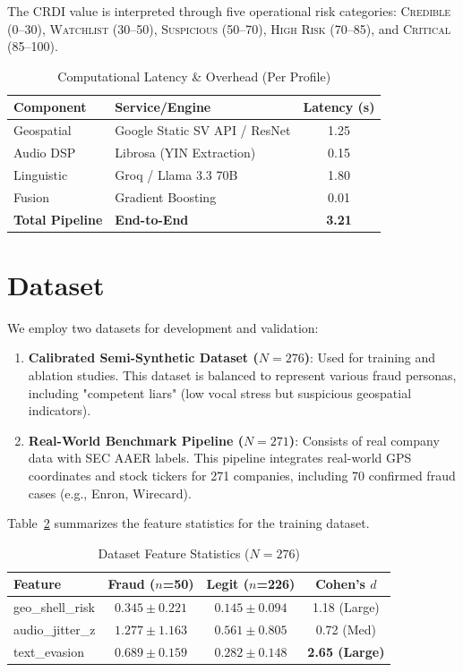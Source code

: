 \documentclass[conference]{IEEEtran}
\begin{document}
The CRDI value is interpreted through five operational risk categories:
\textsc{Credible} (0--30), \textsc{Watchlist} (30--50),
\textsc{Suspicious} (50--70), \textsc{High Risk} (70--85),
and \textsc{Critical} (85--100).

\begin{table}[!t]
 \caption{Computational Latency \& Overhead (Per Profile)}
 \label{tab:latency}
 \centering
 \begin{tabular}{llc}
 \toprule
 \textbf{Component} & \textbf{Service/Engine} & \textbf{Latency (s)} \\
 \midrule
 Geospatial        & Google Static SV API / ResNet & 1.25 \\
 Audio DSP         & Librosa (YIN Extraction)      & 0.15 \\
 Linguistic        & Groq / Llama 3.3 70B          & 1.80 \\
 Fusion & Gradient Boosting             & 0.01 \\
 \midrule
 \textbf{Total Pipeline} & \textbf{End-to-End}    & \textbf{3.21} \\
 \bottomrule
 \end{tabular}
\end{table}

\section{Dataset}

We employ two datasets for development and validation:
\begin{enumerate}
    \item \textbf{Calibrated Semi-Synthetic Dataset ($N=276$)}: Used for training and ablation studies. This dataset is balanced to represent various fraud personas, including "competent liars" (low vocal stress but suspicious geospatial indicators).
    \item \textbf{Real-World Benchmark Pipeline ($N=271$)}: Consists of real company data with SEC AAER labels. This pipeline integrates real-world GPS coordinates and stock tickers for 271 companies, including 70 confirmed fraud cases (e.g., Enron, Wirecard).
\end{enumerate}

Table~\ref{tab:dataset} summarizes the feature statistics for the training dataset.

\begin{table}[!t]
 \caption{Dataset Feature Statistics ($N=276$)}
 \label{tab:dataset}
 \centering
 \begin{tabular}{lccc}
 \toprule
 \textbf{Feature} & \textbf{Fraud ($n$=50)} & \textbf{Legit ($n$=226)} & \textbf{Cohen's $d$} \\
 \midrule
 geo\_shell\_risk & $0.345 \pm 0.221$ & $0.145 \pm 0.094$ & 1.18 (Large) \\
 audio\_jitter\_z & $1.277 \pm 1.163$ & $0.561 \pm 0.805$ & 0.72 (Med) \\
 text\_evasion    & $0.689 \pm 0.159$ & $0.282 \pm 0.148$ & \textbf{2.65 (Large)} \\
 \bottomrule
 \end{tabular}
\end{table}
\end{document}

